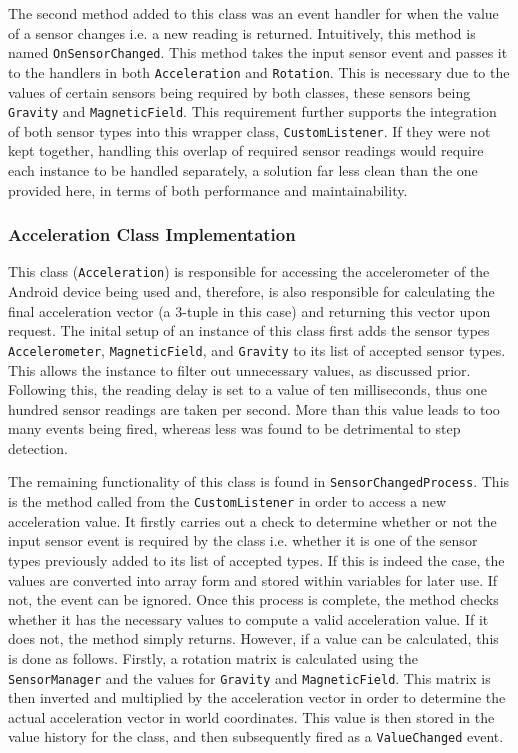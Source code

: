 \documentclass[main.tex]{subfiles}
\begin{document}
            The second method added to this class was an event handler for when the value of a sensor changes i.e. a new reading is returned. Intuitively, this method
            is named \texttt{OnSensorChanged}. This method takes the input sensor event and passes it to the handlers in both \texttt{Acceleration} and \texttt{Rotation}.
            This is necessary due to the values of certain sensors being required by both classes, these sensors being \texttt{Gravity} and \texttt{MagneticField}. This requirement
            further supports the integration of both sensor types into this wrapper class, \texttt{CustomListener}. If they were not kept together, handling this overlap of 
            required sensor readings would require each instance to be handled separately, a solution far less clean than the one provided here, in terms of both performance and
            maintainability.
        \subsubsection{Acceleration Class Implementation}
            This class (\texttt{Acceleration}) is responsible for accessing the accelerometer of the Android device being used and, therefore, is also responsible for calculating
            the final acceleration vector (a 3-tuple in this case) and returning this vector upon request. The inital setup of an instance of this class first adds 
            the sensor types \texttt{Accelerometer}, \texttt{MagneticField}, and \texttt{Gravity} to its list of accepted sensor types. This allows the instance to filter out
            unnecessary values, as discussed prior. Following this, the reading delay is set to a value of ten milliseconds, thus one hundred sensor readings are taken per second.
            More than this value
            leads to too many events being fired, whereas less was found to be detrimental to step detection.
            
            The remaining functionality of this class is found in \texttt{SensorChangedProcess}. This is the method called from the \texttt{CustomListener} in order to access a new
            acceleration value. It firstly carries out a check to determine whether or not the input sensor event is required by the class i.e. whether it is one of the sensor types previously
            added to its list of accepted types. If this is indeed the case, the values are converted into array form and stored within variables for later use. If not, the event can
            be ignored. Once this process is complete, the method checks whether it has the necessary values to compute a valid acceleration value. If it does not, the method 
            simply returns. However, if a value can be calculated, this is done as follows. Firstly, a rotation matrix is calculated using the \texttt{SensorManager} and the
            values for \texttt{Gravity} and \texttt{MagneticField}. This matrix is then inverted and multiplied by the acceleration vector in order to determine the actual
            acceleration vector in world coordinates. This value is then stored in the value history for the class, and then subsequently fired as a \texttt{ValueChanged} event.
\end{document}
